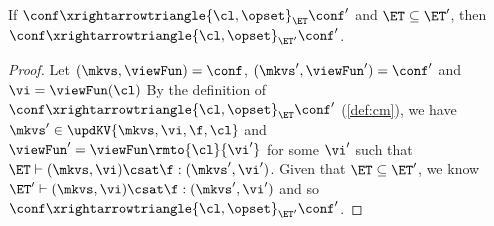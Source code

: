 \begin{lemma}
\label{lem:mono-et}
If $\conf \xrightarrowtriangle{\cl, \opset}_{\ET} \conf'$ and $\ET \subseteq \ET'$, 
then $\conf \xrightarrowtriangle{\cl, \opset}_{\ET'} \conf'$.
\end{lemma}
\begin{proof}
    Let \((\mkvs, \viewFun)  = \conf \), \( (\mkvs', \viewFun') = \conf' \) and \( \vi  =\viewFun(\cl) \)
    By the definition of  $\conf \xrightarrowtriangle{\cl, \opset}_{\ET} \conf'$ (\cref{def:cm}), we have \(\mkvs' \in \updKV{\mkvs, \vi, \f, \cl}\) and  \( \viewFun' = \viewFun\rmto{\cl}{\vi'} \) for some \( \vi' \) such that \( \ET \vdash (\mkvs, \vi) \csat \f : (\mkvs',\vi') \).
    Given that \( \ET \subseteq \ET'\), we know \( \ET' \vdash (\mkvs, \vi) \csat \f : (\mkvs',\vi') \) and so $\conf \xrightarrowtriangle{\cl, \opset}_{\ET'} \conf'$.
\end{proof}

